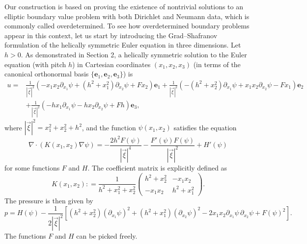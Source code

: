 \documentclass[12pt,reqno]{amsart}
\numberwithin{equation}{section}
\theoremstyle{definition}
\theoremstyle{remark}
\begin{document}
Our construction is based on proving the existence of nontrivial solutions to an elliptic boundary value problem with both Dirichlet and Neumann data, which is commonly called overdetermined. To see how overdetermined boundary problems appear in this context, let us start by introducing the Grad--Shafranov formulation of the helically symmetric Euler equation in three dimensions. Let $ h>0 $. As demonstrated in Section 2, a helically symmetric solution to the Euler equation (with pitch $ h $) in Cartesian coordinates $(x_1,x_2,x_3)$ (in terms of the canonical orthonormal basis $\{\mathbf{e}_1, \mathbf{e}_2, \mathbf{e}_3\}$) is
\begin{equation}\label{2-5-1}
\begin{split}
u=&\frac{1}{|\vec{\xi}|^2}\left(-x_1x_2\partial_{x_1}\psi+(h^2+x_1^2)\partial_{x_2}\psi+F x_2 \right)\mathbf{e}_1+ \frac{1}{|\vec{\xi}|^2}\left(-(h^2+x_2^2)\partial_{x_1}\psi+x_1x_2\partial_{x_2}\psi-F x_1 \right)\mathbf{e}_2\\
&+\frac{1}{|\vec{\xi}|^2}\left(-hx_1 \partial_{x_1}\psi-hx_2\partial_{x_2}\psi+F h \right)\mathbf{e}_3,
\end{split} 
\end{equation}
where $ |\vec{\xi}|^2=x_1^2+x_2^2+h^2 $, and the function $\psi(x_1,x_2)$ satisfies the equation
\begin{equation}\label{Grad Shaf eqs} 
\nabla\cdot(K(x_1,x_2)\nabla\psi)=-\frac{2h^2F(\psi)}{|\vec{\xi}|^4}-\frac{F'(\psi)F(\psi)}{|\vec{\xi}|^2}+H'(\psi) 
\end{equation}
for some functions $F$ and $H$. The coefficient matrix is explicitly defined as 
	\begin{equation*} 
K(x_1,x_2): =\frac{1}{h^2+x_1^2+x_2^2}
\begin{pmatrix}
h^2+x_2^2 & -x_1x_2 \\
-x_1x_2 &  h^2+x_1^2
\end{pmatrix}.
\end{equation*}
The pressure is then given by
\begin{equation}\label{eq:pressure} 
p = H(\psi)-\frac1{2|\vec{\xi}|^2}
\left[(h^2+x_2^2)(\partial_{x_1}\psi)^2+(h^2+x_1^2)(\partial_{x_2}\psi)^2
-2x_1x_2\partial_{x_1}\psi\,\partial_{x_2}\psi+F(\psi)^2\right].
\end{equation}
The functions $F$ and $H$ can be picked freely.
\end{document}
